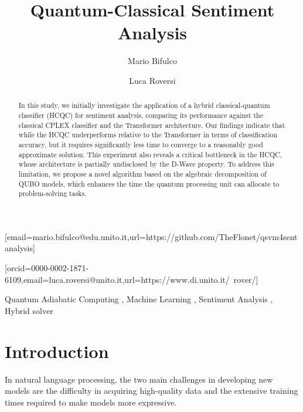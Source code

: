 \documentclass{ceurart}
\begin{document}
\title{Quantum-Classical Sentiment Analysis}
\author[1]{Mario Bifulco}[email=mario.bifulco@edu.unito.it,url=https://github.com/TheFlonet/qsvm4sentanalysis]
\author[1]{Luca Roversi}[orcid=0000-0002-1871-6109,email=luca.roversi@unito.it,url=https://www.di.unito.it/~rover/]
\address[1]{Università degli studi di Torino, Dipartimento di Informatica, Corso Svizzera 185 - 10149 Torino}

\begin{abstract}
    In this study, we initially investigate the application of a hybrid classical-quantum classifier (HCQC) for sentiment analysis, comparing its performance against the classical CPLEX classifier and the Transformer architecture. Our findings indicate that while the HCQC underperforms relative to the Transformer in terms of classification accuracy, but it requires significantly less time to converge to a reasonably good approximate solution. This experiment also reveals a critical bottleneck in the HCQC, whose architecture is partially undisclosed by the D-Wave property. To address this limitation, we propose a novel algorithm based on the algebraic decomposition of QUBO models, which enhances the time the quantum processing unit can allocate to problem-solving tasks.
\end{abstract}
\begin{keywords}
    Quantum Adiabatic Computing \sep 
    Machine Learning \sep
    Sentiment Analysis \sep 
    Hybrid solver 
\end{keywords}

\maketitle

\section{Introduction}
In natural language processing, the two main challenges in developing new models are the difficulty in acquiring high-quality data and the extensive training times required to make models more expressive\cite{scaling}.
\end{document}
